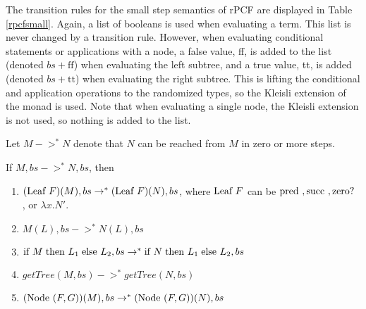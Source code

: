 \begin{table}
\begin{center}
\caption{Small Step Semantics For PCF} \label{rpcfsmall}
\end{center}
\end{table}

The transition rules for the small step semantics of rPCF are displayed in Table \ref{rpcfsmall}.  Again, a list of booleans is used when evaluating a term.  This list is never changed by a transition rule.  However, when evaluating conditional statements or applications with a node, a false value, ff, is added to the list (denoted $bs+\text{ff}$) when evaluating the left subtree, and a true value, tt, is added (denoted $bs+\text{tt}$) when evaluating the right subtree.  This is lifting the conditional and application operations to the randomized types, so the Kleisli extension of the monad is used.  Note that when evaluating a single node, the Kleisli extension is not used, so nothing is added to the list.

Let $M->^{*}N$ denote that $N$ can be reached from $M$ in zero or more steps.

\begin{lemma} \label{small1}
If $M, bs->^{*}N, bs$, then 
\begin{enumerate}
\item
$(\textrm{Leaf } F)(M), bs ->^{*}(\textrm{Leaf } F)(N), bs$, where $\textrm{Leaf } F$ can be $\textrm{pred }, \textrm{succ }, \textrm{zero? }$, or $\lambda x.N'$.
\item
$M(L), bs->^{*}N(L), bs$
\item
$\textrm{if } M\;\textrm{then } L_1\;\textrm{else } L_2, bs ->^{*} \textrm{if } N\;\textrm{then } L_1\;\textrm{else } L_2, bs$
\item
$getTree(M, bs) ->^{*} getTree(N, bs)$
\item
$(\textrm{Node }(F,G))(M), bs ->^{*} (\textrm{Node }(F,G))(N), bs$
\end{enumerate}
\end{lemma}

